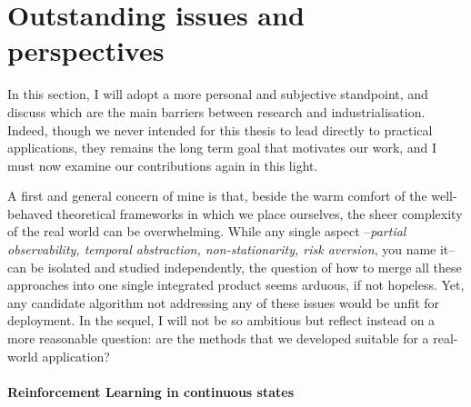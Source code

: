 \section{Outstanding issues and perspectives}

In this section, I will adopt a more personal and subjective standpoint, and discuss which are the main barriers between research and industrialisation. Indeed, though we never intended for this thesis to lead directly to practical applications, they remains the long term goal that motivates our work, and I must now examine our contributions again in this light.

A first and general concern of mine is that, beside the warm comfort of the well-behaved theoretical frameworks in which we place ourselves, the sheer complexity of the real world can be overwhelming. While any single aspect --\emph{partial observability, temporal abstraction, non-stationarity, risk aversion}, you name it-- can be isolated and studied independently, the question of how to merge all these approaches into one single integrated product seems arduous, if not hopeless. Yet, any candidate algorithm not addressing any of these issues would be unfit for deployment.
In the sequel, I will not be so ambitious but reflect instead on a more reasonable question: are the methods that we developed suitable for a real-world application?

\paragraph{Reinforcement Learning in continuous states}

